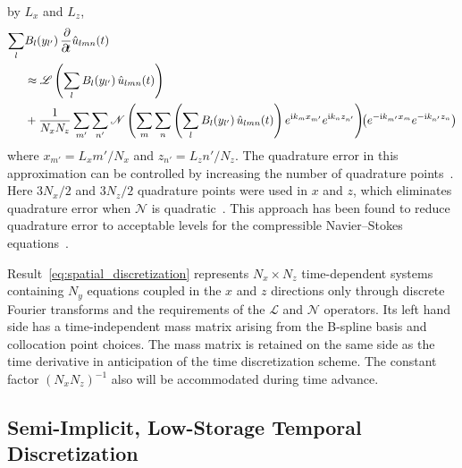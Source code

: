 by $L_x$ and $L_z$,
\begin{align}
  \sum_{l} &B_l\!\left(y_{l'}\right)
  \frac{\partial\!}{\partial\!t} \hat{u}_{l m n}(t)
\notag\\
  &\approx
  \mathscr{L}\left(
    \sum_{l}
     B_l\!\left(y_{l'}\right)
    \hat{u}_{l m n}(t)
  \right)
\notag\\
  &{}+
  \frac{1}{N_x N_z}
  \sum_{m'} \sum_{n'}
  \mathscr{N}\left(
    \sum_{m}
    \sum_{n}
    \left(
      \sum_{l} B_l\!\left(y_{l'}\right)
      \hat{u}_{l m n}(t)
    \right)
    e^{\mathrm{i} k_m x_{m'}}e^{\mathrm{i} k_n z_{n'}}
  \right)
  \!\!
  \left(
    e^{-\mathrm{i} k_{m'} x_m}e^{-\mathrm{i} k_{n'} z_n}
  \right)
  \label{eq:spatial_discretization}
\end{align}
where $x_{m'}=L_x m' / N_x$ and $z_{n'}=L_z n' / N_z$.
%
The quadrature error in this approximation can be controlled by increasing the
number of quadrature points~\citep{Boyd2001}.  Here $3 N_x/2$ and $3 N_z/2$
quadrature points were used in $x$ and $z$, which eliminates quadrature error
when $\mathscr{N}$ is quadratic~\citep{Canuto2006}.  This approach has been
found to reduce quadrature error to acceptable levels for the compressible
Navier--Stokes equations~\citep{Buell1990Direct}.

Result~\eqref{eq:spatial_discretization} represents $N_x\times{}N_z$
time-dependent systems containing $N_y$ equations coupled in the $x$ and $z$
directions only through discrete Fourier transforms and the requirements of the
$\mathscr{L}$ and $\mathscr{N}$ operators.  Its left hand side has a
time-independent mass matrix arising from the B-spline basis and collocation
point choices.  The mass matrix is retained on the same side as the time
derivative in anticipation of the time discretization scheme.  The constant
factor $\left(N_x N_z\right)^{-1}$ also will be accommodated during time
advance.

\subsection{Semi-Implicit, Low-Storage Temporal Discretization}
\label{sec:timediscretization}

